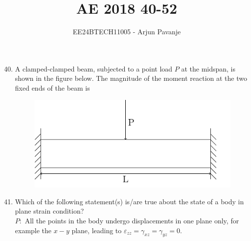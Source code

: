 \documentclass[journal]{IEEEtran}
\begin{document}

\vspace{3cm}
	
\title{AE 2018 40-52}
\author{EE24BTECH11005 - Arjun Pavanje}

{\let\newpage\relax\maketitle}
\begin{enumerate}
\setcounter{enumi}{39}
		\item A clamped-clamped beam, subjected to a point load $P$ at the midspan, is shown in the figure below. The magnitude of the moment reaction at the two fixed ends of the beam is
\begin{figure}[H]
			\centering
			\includegraphics[scale=0.75]{figs/q30.png}
\end{figure}
		\begin{enumerate}
		\end{enumerate}
	\item Which of the following statement(s) is/are true about the state of a body in plane strain condition?\\
		$P:$ All the points in the body undergo displacements in one plane only, for example the $x-y$ plane, leading to $\varepsilon_{zz} = \gamma_{xz}=\gamma_{yz}=0$.\\

\end{enumerate}
\end{document}
